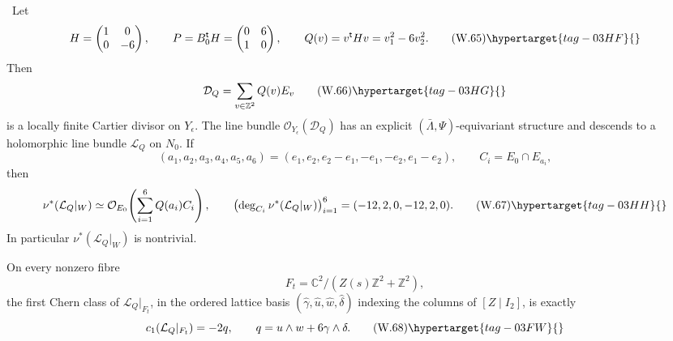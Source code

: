 \begin{proposition}
\hypertarget{tag-03IN}{}\label{wbII:prop:local-cusp-picard-obstruction}

\ Let
\[
 H=\begin{pmatrix}1&0\\0&-6\end{pmatrix},
 \qquad
 P=B_0^{\mathsf t}H=\begin{pmatrix}0&6\\1&0\end{pmatrix},
 \qquad
 Q(v)=v^{\mathsf t}Hv=v_1^2-6v_2^2.
\tag{W.65}\hypertarget{tag-03HF}{}\label{wbII:eq:W:5.17x}
\]
Then
\[
 \mathcal D_Q=\sum_{v\in\mathbb Z^2}Q(v)E_v
\tag{W.66}\hypertarget{tag-03HG}{}\label{wbII:eq:W:5.17y}
\]
is a locally finite Cartier divisor on \(Y_\epsilon\).
The line bundle \(\mathcal O_{Y_\epsilon}(\mathcal D_Q)\) has an explicit
\((\bar\Lambda,\Psi)\)-equivariant structure and descends to a holomorphic
line bundle \(\mathcal L_Q\) on \(N_0\).  If
\[
 (a_1,a_2,a_3,a_4,a_5,a_6)
 =(e_1,e_2,e_2-e_1,-e_1,-e_2,e_1-e_2),
 \qquad C_i=E_0\cap E_{a_i},
\]
then
\[
 \nu^*(\mathcal L_Q|_W)
 \simeq
 \mathcal O_{E_0}\!\left(\sum_{i=1}^6Q(a_i)C_i\right),
\qquad
 \left(\deg_{C_i}\nu^*(\mathcal L_Q|_W)\right)_{i=1}^6
 =(-12,2,0,-12,2,0).
\tag{W.67}\hypertarget{tag-03HH}{}\label{wbII:eq:W:5.17z}
\]
In particular \(\nu^*(\mathcal L_Q|_W)\) is nontrivial.

On every nonzero fibre
\[
 F_t=\mathbb C^2/(Z(s)\mathbb Z^2+\mathbb Z^2),
\]
the first Chern class of \(\mathcal L_Q|_{F_t}\), in the ordered lattice
basis
\((\widehat\gamma,\widehat u,\widehat w,\widehat\delta)\) indexing the
columns of \([Z\mid I_2]\), is exactly
\[
 c_1(\mathcal L_Q|_{F_t})=-2q,
 \qquad
 q=u\wedge w+6\gamma\wedge\delta.
\tag{W.68}\hypertarget{tag-03FW}{}\label{wbII:eq:W:5.17aa}
\]
\end{proposition}



